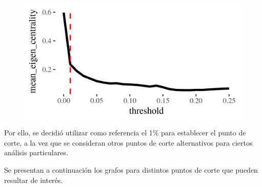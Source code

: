 \documentclass[runningheads,a4paper]{llncs}
\begin{document}
\begin{figure}[h]
    \centering
    \includegraphics[scale=.5]{2011_autovalor_medio_x_threshold}
    \caption{}
    \label{fig:2011_autovalor_medio_x_threshold}
\end{figure}

Por ello, se decidió utilizar como referencia el 1\% para establecer el punto de corte, a la vez que se consideran otros puntos de corte alternativos para ciertos análisis particulares.

Se presentan a continuación los grafos para distintos puntos de corte que pueden resultar de interés.
\end{document}
